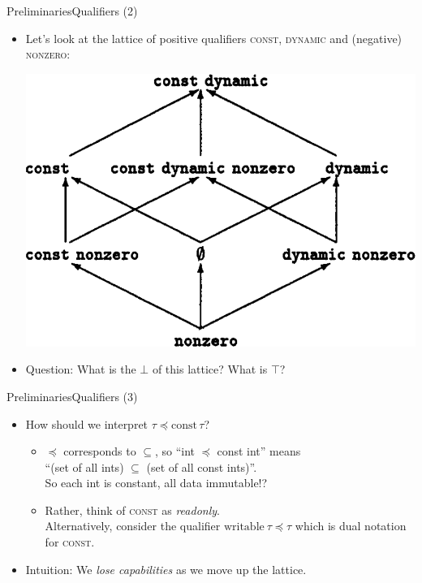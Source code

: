 \documentclass{beamer}
\begin{document}
\begin{frame}{Preliminaries}{Qualifiers (2)}
  \begin{itemize}
  \item Let's look at the lattice of positive qualifiers \textsc{const}, \textsc{dynamic} and (negative) \textsc{nonzero}: 
    \begin{center}\includegraphics[scale=0.25]{paper_qualifierlattice_sample.png}\end{center}
  \item<2-> Question: What is the $\bot$ of this lattice? What is $\top$?\\
  \end{itemize}
\end{frame}

\begin{frame}{Preliminaries}{Qualifiers (3)}
  \begin{itemize}
  \item How should we interpret $\tau \preceq \text{const}\,\tau$?
    \begin{itemize}
    \item<2-> $\preceq$ corresponds to $\subseteq$, so ``int $\preceq$ const int'' means\\ ``(set of all ints) $\subseteq$ (set of all const ints)''.\\
    So each int is constant, all data immutable!?
    \item<3-> Rather, think of \textsc{const} as \emph{readonly}.\\ Alternatively, consider the qualifier $\text{writable}\ \tau \preceq \tau$ which is dual notation for \textsc{const}.
    \end{itemize}
  \item<4->[$\Rightarrow$] Intuition: We \emph{lose capabilities} as we move up the lattice.
  \end{itemize}
\end{frame}
\end{document}
